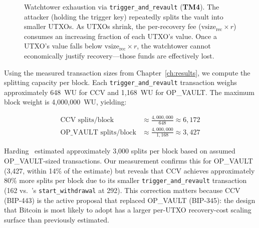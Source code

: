 \begin{figure}[t]
{}
\caption{Watchtower exhaustion via \texttt{trigger\_and\_revault} (\textbf{TM4}).
The attacker (holding the trigger key) repeatedly splits the vault into smaller
UTXOs. As UTXOs shrink, the per-recovery fee ($\text{vsize}_{\text{rec}} \times r$)
consumes an increasing fraction of each UTXO's value. Once a UTXO's value falls
below $\text{vsize}_{\text{rec}} \times r$, the watchtower cannot economically
justify recovery---those funds are effectively lost.}
\label{fig:watchtower_exhaustion}
\end{figure}

Using the measured transaction sizes from Chapter~\ref{ch:results}, we compute the
splitting capacity per block. Each \texttt{trigger\_and\_revault} transaction weighs
approximately 648~WU for CCV and 1{,}168~WU for OP\_VAULT. The maximum block weight
is 4{,}000{,}000~WU, yielding:

\begin{align}
\text{CCV splits/block}      &\approx \frac{4{,}000{,}000}{648} \approx 6{,}172 \\
\text{OP\_VAULT splits/block} &\approx \frac{4{,}000{,}000}{1{,}168} \approx 3{,}427
\end{align}

Harding~\cite{Har24} estimated approximately 3{,}000 splits per block based on
assumed OP\_VAULT-sized transactions. Our measurement confirms this for OP\_VAULT
(3{,}427, within 14\% of the estimate) but reveals that CCV achieves approximately
80\% more splits per block due to its smaller \texttt{trigger\_and\_revault}
transaction (162\vB{} vs.\ \opvault{}'s \texttt{start\_withdrawal} at 292\vB{}). This correction matters because CCV (BIP-443) is the active proposal
that replaced OP\_VAULT (BIP-345): the design that Bitcoin is most likely to adopt
has a larger per-UTXO recovery-cost scaling surface than previously estimated.


